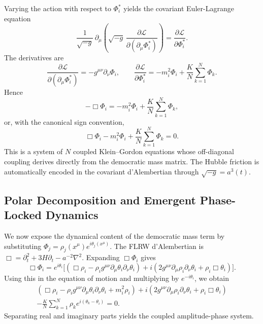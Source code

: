 Varying the action with respect to $\Phi_i^*$ yields the covariant Euler-Lagrange equation
\begin{equation}
\frac{1}{\sqrt{-g}}\,\partial_\mu\!\left(\sqrt{-g}\,\frac{\partial\mathcal{L}}{\partial(\partial_\mu\Phi_i^*)}\right)
= \frac{\partial\mathcal{L}}{\partial\Phi_i^*} .
\end{equation}
The derivatives are
\begin{equation}
\frac{\partial\mathcal{L}}{\partial(\partial_\mu\Phi_i^*)} = -g^{\mu\nu}\partial_\nu\Phi_i,
\qquad
\frac{\partial\mathcal{L}}{\partial\Phi_i^*}
= -m_i^2\Phi_i + \frac{K}{N}\sum_{k=1}^N\Phi_k .
\end{equation}
Hence
\begin{equation}
-\Box\Phi_i = -m_i^2\Phi_i + \frac{K}{N}\sum_{k=1}^N\Phi_k ,
\end{equation}
or, with the canonical sign convention,
\begin{equation}
\boxed{
\Box\Phi_i - m_i^2\Phi_i + \frac{K}{N}\sum_{k=1}^N\Phi_k = 0
} .
\end{equation}
This is a system of $N$ coupled Klein--Gordon equations whose off-diagonal coupling derives directly from the democratic mass matrix. The Hubble friction is automatically encoded in the covariant d'Alembertian through $\sqrt{-g}=a^3(t)$.

\subsection{Polar Decomposition and Emergent Phase-Locked Dynamics}
\label{subsec:polar}

We now expose the dynamical content of the democratic mass term by substituting $\Phi_j=\rho_j(x^\mu)e^{i\theta_j(x^\mu)}$. The FLRW d'Alembertian is $\Box = \partial_t^2 + 3H\partial_t - a^{-2}\nabla^2$. Expanding $\Box\Phi_i$ gives
\begin{equation}
\Box\Phi_i
= e^{i\theta_i}\Big[(\Box\rho_i - \rho_i g^{\mu\nu}\partial_\mu\theta_i\partial_\nu\theta_i)
+ i(2g^{\mu\nu}\partial_\mu\rho_i\partial_\nu\theta_i + \rho_i\Box\theta_i)\Big] .
\end{equation}
Using this in the equation of motion and multiplying by $e^{-i\theta_i}$, we obtain
\begin{multline}
(\Box\rho_i - \rho_i g^{\mu\nu}\partial_\mu\theta_i\partial_\nu\theta_i + m_i^2\rho_i)
+ i(2g^{\mu\nu}\partial_\mu\rho_i\partial_\nu\theta_i + \rho_i\Box\theta_i) \\
- \frac{K}{N}\sum_{k=1}^N \rho_k e^{i(\theta_k-\theta_i)} = 0 .
\end{multline}
Separating real and imaginary parts yields the coupled amplitude-phase system.

